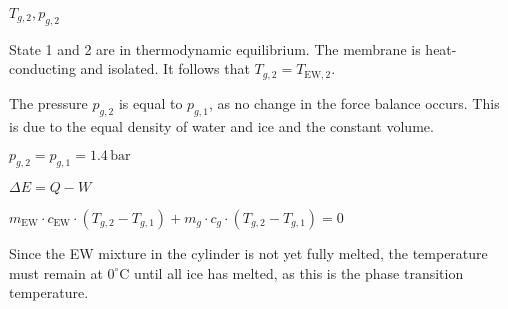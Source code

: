 \( T_{g,2}, p_{g,2} \)  

State 1 and 2 are in thermodynamic equilibrium. The membrane is heat-conducting and isolated. It follows that \( T_{g,2} = T_{\text{EW},2} \).  

The pressure \( p_{g,2} \) is equal to \( p_{g,1} \), as no change in the force balance occurs. This is due to the equal density of water and ice and the constant volume.  

\( p_{g,2} = p_{g,1} = 1.4 \, \text{bar} \)  

\( \Delta E = Q - W \)  

\( m_{\text{EW}} \cdot c_{\text{EW}} \cdot (T_{g,2} - T_{g,1}) + m_g \cdot c_g \cdot (T_{g,2} - T_{g,1}) = 0 \)  

Since the EW mixture in the cylinder is not yet fully melted, the temperature must remain at \( 0^\circ \text{C} \) until all ice has melted, as this is the phase transition temperature.